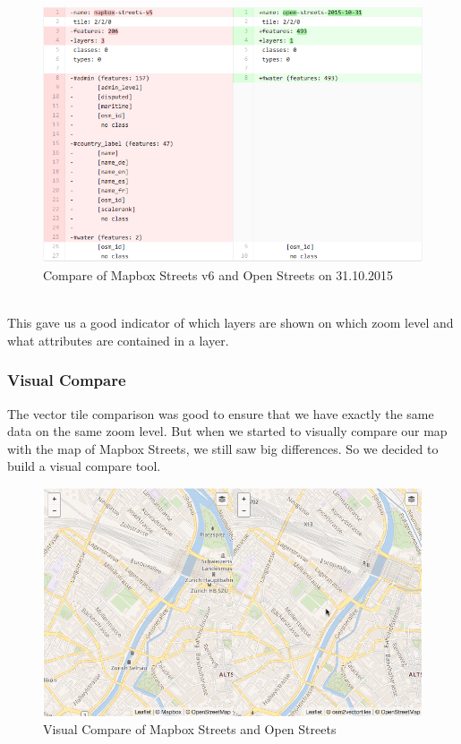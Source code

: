\begin{figure}[H]
  \centering
  \includegraphics[width=1\textwidth]{images/vector_tile_compare.png}
  \caption{Compare of Mapbox Streets v6 and Open Streets on 31.10.2015}
\end{figure}
\\
This gave us a good indicator of which layers are shown on which zoom level and what attributes are contained in a layer.

\subsubsection{Visual Compare}\label{visual_compare}
The vector tile comparison was good to ensure that we have exactly the same data on the same zoom level. But when we started to visually compare our map with the map of Mapbox Streets, we still saw big differences. So we decided to build a visual compare tool. 

\begin{figure}[H]
  \centering
  \includegraphics[width=1\textwidth]{images/visual_compare.png}
  \caption{Visual Compare of Mapbox Streets and Open Streets}
\end{figure}

